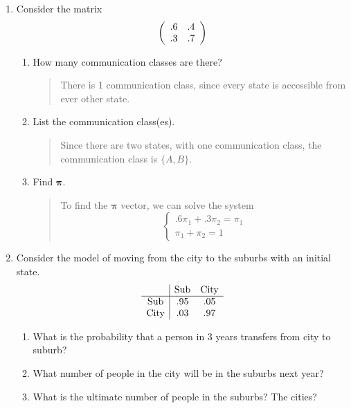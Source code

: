 \documentclass{hw}
\begin{document}
\begin{enumerate}
\item Consider the matrix
\[
\left(
\begin{array}{c c}
.6 & .4\\
.3 & .7
\end{array}
\right)
\]
\begin{enumerate}
\item How many communication classes are there?
\begin{quote}
There is 1 communication class, since every state is accessible from ever other state.
\end{quote}
\item List the communication class(es).
\begin{quote}
Since there are two states, with one communication class, the communication class is $\{A,B\}$.
\end{quote}
\item Find $\mathbf{\pi}$.
\begin{quote}
To find the $\mathbf{\pi}$ vector, we can solve the system
\[
\begin{cases}
.6\pi_{1}+.3\pi_{2}=\pi_{1}\\
\pi_{1}+\pi_{2}=1
\end{cases}
\]
\end{quote}
\end{enumerate}
\item Consider the model of moving from the city to the suburbs with an initial state.
\[
\begin{array}{c | c c}
& \text{Sub} & \text{City}\\
\hline
\text{Sub} & .95 & .05\\
\text{City} & .03 & .97
\end{array}
\]
\begin{enumerate}
\item What is the probability that a person in 3 years transfers from city to suburb?
\item What number of people in the city will be in the suburbs next year?
\item What is the ultimate number of people in the suburbs? The cities?
\end{enumerate}
\end{enumerate}
\end{document}
